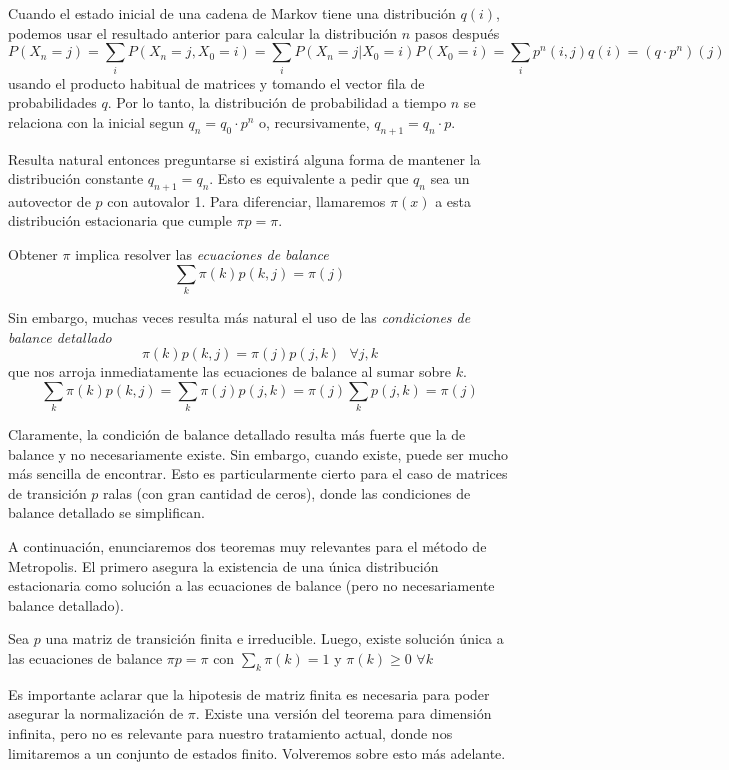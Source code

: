 Cuando el estado inicial de una cadena de Markov tiene una distribución $q(i)$, podemos usar el resultado anterior para calcular la distribución $n$ pasos después
\[ P(X_n=j) = \sum_i P(X_n=j,X_0=i) =  \sum_i P(X_n=j|X_0=i)P(X_0=i) = \sum_i p^n(i,j)q(i) = (q\cdot p^n)(j)\]
usando el producto habitual de matrices y tomando el vector fila de probabilidades $q$.
Por lo tanto, la distribución de probabilidad a tiempo $n$ se relaciona con la inicial segun $q_n = q_0\cdot p^n$ o, recursivamente, $q_{n+1} = q_n\cdot p$.

Resulta natural entonces preguntarse si existirá alguna forma de mantener la distribución constante $q_{n+1} = q_n$.
Esto es equivalente a pedir que $q_n$ sea un autovector de $p$ con autovalor 1. 
Para diferenciar, llamaremos $\pi(x)$ a esta distribución estacionaria que cumple $\pi p = \pi$.

Obtener $\pi$ implica resolver las \textit{ecuaciones de balance}
\[ \sum_k \pi(k) p(k, j) = \pi(j) \]

Sin embargo, muchas veces resulta más natural el uso de las \textit{condiciones de balance detallado}
\[ \pi(k) p(k, j) = \pi(j)p(j, k) \text{ } \forall j,k \]
que nos arroja inmediatamente las ecuaciones de balance al sumar sobre $k$.
\[ \sum_k \pi(k) p(k, j) = \sum_k \pi(j)p(j, k) = \pi(j) \sum_k p(j,k) = \pi(j) \]

Claramente, la condición de balance detallado resulta más fuerte que la de balance y no necesariamente existe.
Sin embargo, cuando existe, puede ser mucho más sencilla de encontrar.
Esto es particularmente cierto para el caso de matrices de transición $p$ ralas (con gran cantidad de ceros), donde las condiciones de balance detallado se simplifican.

A continuación, enunciaremos dos teoremas muy relevantes para el método de Metropolis.
El primero asegura la existencia de una única distribución estacionaria como solución a las ecuaciones de balance (pero no necesariamente balance detallado).

\begin{theorem}
 Sea $p$ una matriz de transición finita e irreducible. Luego, existe solución única a las ecuaciones de balance $\pi p = \pi$ con $\sum_k \pi(k) = 1$ y $\pi(k)\geq 0$ $\forall k$
\end{theorem}

Es importante aclarar que la hipotesis de matriz finita es necesaria para poder asegurar la normalización de $\pi$. 
Existe una versión del teorema para dimensión infinita, pero no es relevante para nuestro tratamiento actual, donde nos limitaremos a un conjunto de estados finito.
Volveremos sobre esto más adelante.

